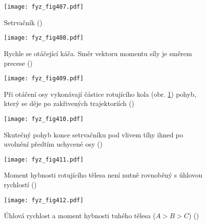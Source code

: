   \begin{figure}[ht!] %
    \centering
    \texttt{[image: fyz\_fig407.pdf]}
    \caption{Setrvačník
             (\cite[s.~279]{Feynman01})}
    \label{fyz_fig407}
  \end{figure}

  \begin{figure}[ht!] %
    \centering
    \texttt{[image: fyz\_fig408.pdf]}
    \caption{Rychle se otáčející káča. Směr vektoru momentu síly je směrem precese 
             (\cite[s.~280]{Feynman01})}
    \label{fyz_fig408}
  \end{figure}

  \begin{figure}[ht!] %
    \centering
    \texttt{[image: fyz\_fig409.pdf]}
    \caption{Při otáčení osy vykonávají částice rotujícího kola (obr. \ref{fyz_fig407}) pohyb, 
             který se děje po zakřivených trajektoriích 
             (\cite[s.~280]{Feynman01})}
    \label{fyz_fig409}
  \end{figure}

  \begin{figure}[ht!] %
    \centering
    \texttt{[image: fyz\_fig410.pdf]}
    \caption{Skutečný pohyb konce setrvačníku pod vlivem tíhy ihned po uvolnění předtím uchycené osy
             (\cite[s.~281]{Feynman01})}
    \label{fyz_fig410}
  \end{figure}

  \begin{figure}[ht!] %
    \centering
    \texttt{[image: fyz\_fig411.pdf]}
    \caption{Moment hybnosti rotujícího tělesa není nutně rovnoběný s úhlovou rychlostí
             (\cite[s.~282]{Feynman01})}
    \label{fyz_fig411}
  \end{figure}

  \begin{figure}[ht!] %
    \centering
    \texttt{[image: fyz\_fig412.pdf]}
    \caption{Úhlová rychlost a moment hybnosti tuhého tělesa (\(A>B>C\))
             (\cite[s.~283]{Feynman01})}
    \label{fyz_fig412}
  \end{figure}
  
\printbibliography[title={Seznam literatury}, heading=subbibliography]
